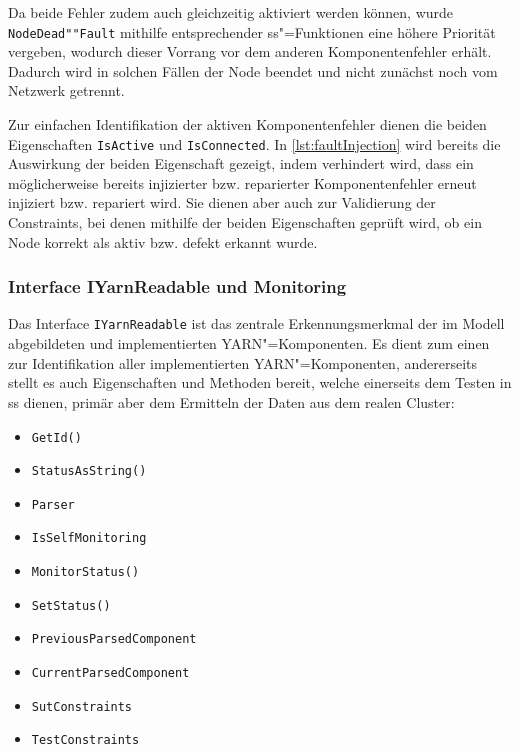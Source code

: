 Da beide Fehler zudem auch gleichzeitig aktiviert werden können, wurde \texttt{NodeDead""Fault} mithilfe entsprechender \ac{ss}"=Funktionen eine höhere Priorität vergeben, wodurch dieser Vorrang vor dem anderen Komponentenfehler erhält.
Dadurch wird in solchen Fällen der Node beendet und nicht zunächst noch vom Netzwerk getrennt.

Zur einfachen Identifikation der aktiven Komponentenfehler dienen die beiden Eigenschaften \texttt{IsActive} und \texttt{IsConnected}.
In \cref{lst:faultInjection} wird bereits die Auswirkung der beiden Eigenschaft gezeigt, indem verhindert wird, dass ein möglicherweise bereits injizierter bzw. reparierter Komponentenfehler erneut injiziert bzw. repariert wird.
Sie dienen aber auch zur Validierung der Constraints, bei denen mithilfe der beiden Eigenschaften geprüft wird, ob ein Node korrekt als aktiv bzw. defekt erkannt wurde.

\subsubsection{Interface IYarnReadable und Monitoring}
\label{subsubsec:yarnComponentInterface}

Das Interface \texttt{IYarnReadable} ist das zentrale Erkennungsmerkmal der im Modell abgebildeten und implementierten \ac{YARN}"=Komponenten.
Es dient zum einen zur Identifikation aller implementierten \ac{YARN}"=Komponenten, andererseits stellt es auch Eigenschaften und Methoden bereit, welche einerseits dem Testen in \ac{ss} dienen, primär aber dem Ermitteln der Daten aus dem realen Cluster:

\begin{itemize}
    \item \texttt{GetId()}
    \item \texttt{StatusAsString()}
    
    \item \texttt{Parser}
    \item \texttt{IsSelfMonitoring}
    \item \texttt{MonitorStatus()}
    \item \texttt{SetStatus()}
    
    \item \texttt{PreviousParsedComponent}
    \item \texttt{CurrentParsedComponent}
    \item \texttt{SutConstraints}
    \item \texttt{TestConstraints}
\end{itemize}

